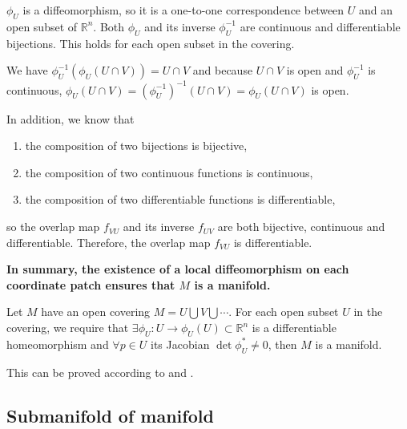 \documentclass[11pt, a4paper]{book}
\begin{document}
\begin{Proof}
  $\phi_U$ is a diffeomorphism, so it is a one-to-one correspondence between $U$ and an
  open subset of $\mathbb{R}^n$. Both $\phi_U$ and its inverse $\phi_U^{-1}$ are
  continuous and differentiable bijections. This holds for each open subset in the
  covering.

  We have $\phi_U^{-1}(\phi_U(U \cap V)) = U \cap V$ and because $U \cap V$ is open and
  $\phi_U^{-1}$ is continuous,
  $\phi_U(U \cap V)=(\phi_U^{-1})^{-1}(U \cap V) = \phi_U(U \cap V)$ is open.
  
  In addition, we know that
  \begin{enumerate}
  \item the composition of two bijections is bijective,
  \item the composition of two continuous functions is continuous,
  \item the composition of two differentiable functions is differentiable,
  \end{enumerate}
  so the overlap map $f_{VU}$ and its inverse $f_{UV}$ are both bijective, continuous and
  differentiable. Therefore, the overlap map $f_{VU}$ is differentiable.

  \textbf{In summary, the existence of a local diffeomorphism on each coordinate patch
    ensures that $M$ is a manifold.}
\end{Proof}

\begin{Proposition}
  Let $M$ have an open covering $M=U \bigcup V \bigcup \cdots$. For each open subset $U$
  in the covering, we require that
  $\exists \phi_U: U \rightarrow \phi_U(U) \subset \mathbb{R}^n$ is a differentiable
  homeomorphism and $\forall p \in U$ its Jacobian $\det{\phi_U^{*}} \neq 0$, then $M$ is
  a manifold.
\end{Proposition}

\begin{Proof}
  This can be proved according to
   and
  .
\end{Proof}


\subsection{Submanifold of manifold}
\end{document}
